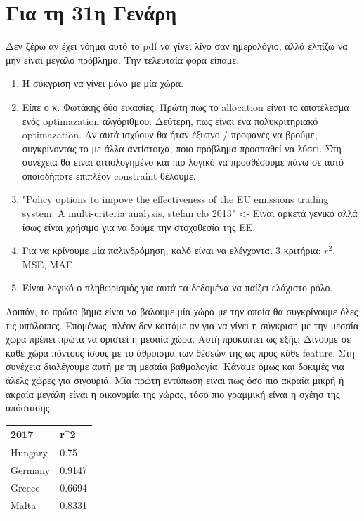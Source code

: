 \documentclass[a4paper,twoside,10pt]{article}
\begin{document}
	
	\section{Για τη 31η Γενάρη}
	Δεν ξέρω αν έχει νόημα αυτό το pdf να γίνει λίγο σαν ημερολόγιο, αλλά ελπίζω να μην είναι μεγάλο πρόβλημα. 
	Την τελευταία φορα είπαμε:
	\begin{enumerate}
		\item Η σύκγριση να γίνει μόνο με μία χώρα.
		\item Είπε ο κ. Φωτάκης δύο εικασίες. Πρώτη πως το allocation είναι το αποτέλεσμα ενός optimazation αλγόριθμου. Δεύτερη, πως είναι ένα πολυκριτηριακό optimazation. Αν αυτά ισχύουν θα ήταν έξυπνο / προφανές να βρούμε, συγκρίνοντάς το με άλλα αντίστοιχα, ποιο πρόβλημα προσπαθεί να λύσει. Στη συνέχεια θα είναι αιτιολογημένο και πιο λογικό να προσθέσουμε πάνω σε αυτό οποιοδήποτε επιπλέον constraint θέλουμε.
		\item "Policy options to impove the effectiveness of the EU emissions trading system: A multi-criteria analysis, stefan clo 2013" <- Είναι αρκετά γενικό αλλά ίσως είναι χρήσιμο για να δούμε την στοχοθεσία της ΕΕ.
		\item Για να κρίνουμε μία παλινδρόμηση, καλό είναι να ελέγχονται 3 κριτήρια: $r^2$, MSE, MAE
		\item Είναι λογικό ο πληθωρισμός για αυτά τα δεδομένα να παίζει ελάχιστο ρόλο.
	\end{enumerate}
	
	Λοιπόν, το πρώτο βήμα είναι να βάλουμε μία χώρα με την οποία θα συγκρίνουμε όλες τις υπόλοιπες. Επομένως, πλέον δεν κοιτάμε αν για να γίνει η σύγκριση με την μεσαία χώρα πρέπει πρώτα να οριστεί η μεσαία χώρα. Αυτή προκύπτει ως εξής: Δίνουμε σε κάθε χώρα πόντους ίσους με το άθροισμα των θέσεών της ως προς κάθε feature. Στη συνέχεια διαλέγουμε αυτή με τη μεσαία βαθμολογία. Κάναμε όμως και δοκιμές για άλελς χώρες για σιγουριά. Μία πρώτη εντύπωση είναι πως όσο πιο ακραία μικρή ή ακραία μεγάλη είναι η οικονομία της χώρας, τόσο πιο γραμμική είναι η σχέησ της απόστασης. 
	\begin{table}[H]
		\centering
		\begin{tabular}{|l|l|}
			\hline
			2017    & r\textasciicircum{}2 \\
			\hline
			Hungary & 0.75                 \\
			Germany & 0.9147               \\
			Greece  & 0.6694               \\
			Malta   & 0.8331            \\
			\hline
		\end{tabular}
	\end{table}
	
\end{document}
